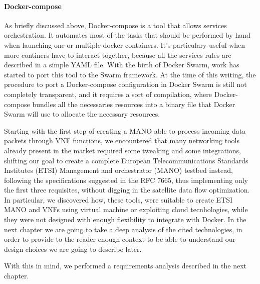 \paragraph{Docker-compose} As briefly discussed above, Docker-compose is a tool
that allows services orchestration. It automates most of the tasks that should
be performed by hand when launching one or multiple docker containers. It's
particulary useful when more continers have to interact together,
because all the services rules are described in a simple YAML file. With
the birth of Docker Swarm, work has started to port this tool to the Swarm
framework. At the time of this writing, the procedure to port a Docker-compose
configuration in Docker Swarm is still not completely transparent, and it
requires a sort of compilation, where Docker-compose bundles all the necessaries
resources into a binary file that Docker Swarm will use to allocate the
necessary resources.

\vspace{0.5cm}

Starting with the first step of creating a MANO able to process incoming data
packets through VNF functions, we encountered that many networking tools already
present in the market required some tweaking and some integrations, shifting our
goal to create a complete European Telecommunications Standards Institutes
(ETSI) Management and orchestrator (MANO) testbed instead, following the
specifications suggested in the RFC 7665, thus implementing only the first three
requisites, without digging in the satellite data flow optimization. In
particular, we discovered how, these tools, were suitable to create ETSI MANO
and VNFs using virtual machine or exploiting cloud tecnhologies, while they were
not designed with enough flexibility to integrate with Docker. In the next
chapter we are going to take a deep analysis of the cited technologies, in order
to provide to the reader enough context to be able to understand our design
choices we are going to describe later.


\noindent With this in mind, we performed a requirements analysis described in
the next chapter.
